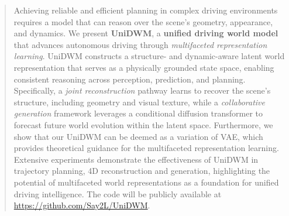 \begin{abstract}
Achieving reliable and efficient planning in complex driving environments requires a model that can reason over the scene’s geometry, appearance, and dynamics. We present \textbf{UniDWM}, a \textbf{unified driving world model} that advances autonomous driving through \textit{multifaceted representation learning}. UniDWM constructs a structure- and dynamic-aware latent world representation that serves as a physically grounded state space, enabling consistent reasoning across perception, prediction, and planning. Specifically, a \textit{joint reconstruction} pathway learns to recover the scene’s structure, including geometry and visual texture, while a \textit{collaborative generation} framework leverages a conditional diffusion transformer to forecast future world evolution within the latent space. Furthermore, we show that our UniDWM can be deemed as a variation of VAE, which provides theoretical guidance for the multifaceted representation learning. Extensive experiments demonstrate the effectiveness of UniDWM in trajectory planning, 4D reconstruction and generation, highlighting the potential of multifaceted world representations as a foundation for unified driving intelligence. The code will be publicly available at \url{https://github.com/Say2L/UniDWM}.
\end{abstract}
